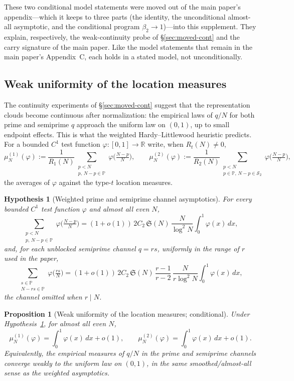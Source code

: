 \documentclass[11pt]{article}
\newcommand{\PP}{\mathbb P}
\newcommand{\SSemi}{\mathcal S_2}
\newcommand{\sing}{\mathfrak S}
\newtheorem{proposition}{Proposition}
\newtheorem{hypothesis}{Hypothesis}
\begin{document}
These two conditional model statements were moved out of the main paper's appendix---which it keeps
to three parts (the identity, the unconditional almost-all asymptotic, and the conditional program
$\beta_2\to1$)---into this supplement. They explain, respectively, the weak-continuity probe of
\S\ref{sec:moved-cont} and the carry signature of the main paper. Like the model statements that
remain in the main paper's Appendix~C, each holds in a stated model, not unconditionally.

\subsection{Weak uniformity of the location measures}
\label{sec:weak-cont}

The continuity experiments of \S\ref{sec:moved-cont} suggest that the representation clouds become
continuous after normalization: the empirical laws of $q/N$ for both prime and semiprime $q$
approach the uniform law on $(0,1)$, up to small endpoint effects. This is what the weighted
Hardy--Littlewood heuristic predicts. For a bounded $C^1$ test function
$\varphi:[0,1]\to\mathbb R$ write, when $R_t(N)\ne0$,
\[
  \mu_N^{(1)}(\varphi):=\frac1{R_1(N)}\!\!\sum_{\substack{p<N\\ p,\,N-p\in\PP}}\!\!\varphi\Big(\tfrac{N-p}{N}\Big),
  \qquad
  \mu_N^{(2)}(\varphi):=\frac1{R_2(N)}\!\!\sum_{\substack{p<N\\ p\in\PP,\,N-p\in\SSemi}}\!\!\varphi\Big(\tfrac{N-p}{N}\Big),
\]
the averages of $\varphi$ against the type-$t$ location measures.

\begin{hypothesis}[Weighted prime and semiprime channel asymptotics]\label{hyp:weighted}
For every bounded $C^1$ test function $\varphi$ and almost all even $N$,
\[
  \sum_{\substack{p<N\\ p,\,N-p\in\PP}}\varphi\Big(\tfrac{N-p}{N}\Big)
  =(1+o(1))\,2C_2\,\sing(N)\,\frac{N}{\log^2N}\int_0^1\varphi(x)\,dx ,
\]
and, for each unblocked semiprime channel $q=rs$, uniformly in the range of $r$ used in the
paper,
\[
  \sum_{\substack{s\in\PP\\ N-rs\in\PP}}\varphi\Big(\tfrac{rs}{N}\Big)
  =(1+o(1))\,2C_2\,\sing(N)\,\frac{r-1}{r-2}\,\frac{N}{r\log^2N}\int_0^1\varphi(x)\,dx ,
\]
the channel omitted when $r\mid N$.
\end{hypothesis}

\begin{proposition}[Weak uniformity of the location measures; conditional]\label{prop:weakcont}
Under Hypothesis~\ref{hyp:weighted}, for almost all even $N$,
\[
  \mu_N^{(1)}(\varphi)=\int_0^1\varphi(x)\,dx+o(1),
  \qquad
  \mu_N^{(2)}(\varphi)=\int_0^1\varphi(x)\,dx+o(1) .
\]
Equivalently, the empirical measures of $q/N$ in the prime and semiprime channels converge
weakly to the uniform law on $(0,1)$, in the same smoothed/almost-all sense as the weighted
asymptotics.
\end{proposition}
\end{document}

